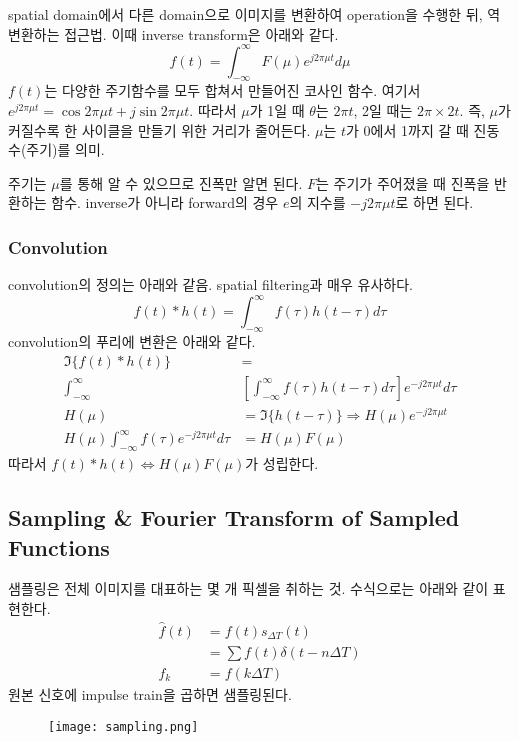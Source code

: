spatial domain에서 다른 domain으로 이미지를 변환하여 operation을 수행한 뒤, 역변환하는 접근법. 이때 inverse transform은 아래와 같다.
$$f(t) = \int_{-\infty}^\infty F(\mu)e^{j2\pi \mu t}d\mu$$
$f(t)$는 다양한 주기함수를 모두 합쳐서 만들어진 코사인 함수. 여기서 $e^{j2\pi \mu t} = \cos 2\pi \mu t + j\sin 2\pi \mu t$. 따라서 $\mu$가 1일 때 $\theta$는 $2\pi t$, 2일 때는 $2\pi \times 2t$. 즉, $\mu$가 커질수록 한 사이클을 만들기 위한 거리가 줄어든다. $\mu$는 $t$가 0에서 1까지 갈 때 진동수(주기)를 의미.

주기는 $\mu$를 통해 알 수 있으므로 진폭만 알면 된다. $F$는 주기가 주어졌을 때 진폭을 반환하는 함수. inverse가 아니라 forward의 경우 $e$의 지수를 $-j2\pi \mu t$로 하면 된다.

\subsubsection{Convolution}

convolution의 정의는 아래와 같음. spatial filtering과 매우 유사하다.
$$f(t) \ast h(t) = \int_{-\infty}^\infty f(\tau)h(t - \tau)d\tau$$
convolution의 푸리에 변환은 아래와 같다.
$$
\begin{aligned}
  \Im\{f(t) \ast h(t)\} &= \\
  \int_{-\infty}^\infty &[\int_{-\infty}^\infty f(\tau)h(t - \tau)d\tau]e^{-j2\pi \mu t}d\tau \\
  H(\mu) &= \Im\{h(t - \tau)\} \Rightarrow H(\mu)e^{-j2\pi \mu t} \\
  H(\mu) \int_{-\infty}^\infty f(\tau)e^{-j2\pi \mu t}d\tau &= H(\mu) F(\mu)
\end{aligned}
$$
따라서 $f(t) \ast h(t) \Leftrightarrow H(\mu) F(\mu)$가 성립한다.

\subsection{Sampling \& Fourier Transform of Sampled Functions}

샘플링은 전체 이미지를 대표하는 몇 개 픽셀을 취하는 것. 수식으로는 아래와 같이 표현한다.
$$
\begin{aligned}
  \hat{f}(t) &= f(t)s_{\Delta T}(t) \\
  &= \sum f(t) \delta(t - n\Delta T) \\
  f_k &= f(k\Delta T)
\end{aligned}
$$
원본 신호에 impulse train을 곱하면 샘플링된다.

\begin{figure}[h]
  \centering
  \texttt{[image: sampling.png]}
\end{figure}

